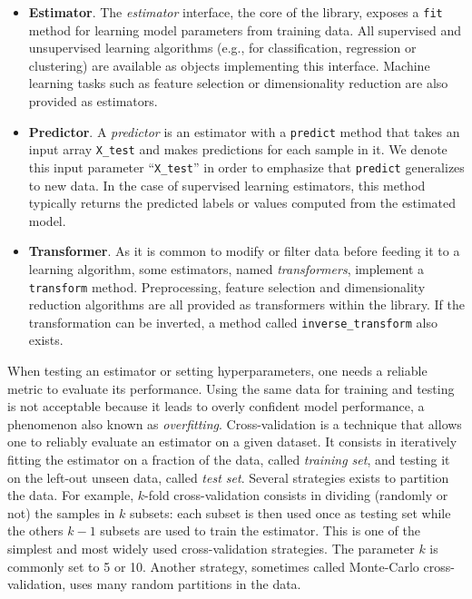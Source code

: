 \documentclass{frontiersSCNS} %
\begin{document}
\begin{itemize}
\item {\bf Estimator}. The \textit{estimator} interface, the core of the
    library, exposes a \texttt{fit} method for learning model parameters from training data.
    All supervised
    and unsupervised learning algorithms (e.g., for classification, regression or
    clustering) are available as objects implementing this interface. Machine
    learning tasks such as feature selection or dimensionality
    reduction are also provided as estimators.

\item {\bf Predictor}. A \textit{predictor} is an estimator with
    a \texttt{predict}
    method that takes an input array \texttt{X\_test} and makes
    predictions for each sample in it.
    We denote this input parameter ``\texttt{X\_test}'' in order
    to emphasize that \texttt{predict} generalizes to new data. In the case of
    supervised learning estimators, this method typically returns the predicted
    labels or values computed from the estimated model.

\item {\bf Transformer}. As it is common to modify or filter data before feeding it to a learning
    algorithm, some estimators, named \textit{transformers}, implement a
    \texttt{transform} method. Preprocessing, feature selection and
    dimensionality reduction
    algorithms are all provided as transformers within the library. If the transformation
    can be inverted, a method called \texttt{inverse\_transform} also exists.

\end{itemize}

\smallskip

When testing an estimator or setting hyperparameters, one needs a reliable
metric to evaluate its performance. Using the same
data for training and testing is not acceptable because it leads to
overly confident model performance, a phenomenon also known as \emph{overfitting}.
Cross-validation is a technique that allows one to reliably evaluate an
estimator on a given dataset. It consists in iteratively fitting the
estimator on a fraction of the data, called \emph{training set}, and testing it
on the left-out unseen data, called \emph{test set}.
Several strategies exists to partition the data.
For example, $k$-fold cross-validation consists in dividing (randomly or not) the samples in $k$
subsets: each subset is then used once as testing set while the others $k - 1$
subsets are used to train the estimator. This is one of the simplest and most
widely used cross-validation strategies. The parameter $k$ is commonly set
to 5 or 10. Another strategy, sometimes called Monte-Carlo cross-validation,
uses many random partitions in the data.
\end{document}
